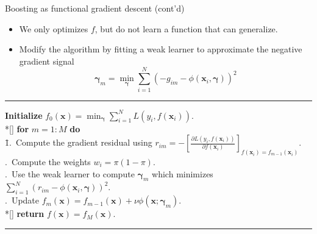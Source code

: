\documentclass[10pt,mathserif]{beamer}
\begin{document}
\begin{frame}{Boosting as functional gradient descent (cont'd)}
\begin{itemize}
    \item We only optimizes $f$, but do not learn a function that can generalize.
    \item Modify the algorithm by fitting a weak learner to approximate the negative gradient signal
    \begin{equation*}
        \bm{\gamma}_m = \min_{\bm{\gamma}} \sum_{i=1}^N (-g_{im} - \phi(\bm{x}_i,\bm{\gamma}))^2
    \end{equation*}
\end{itemize}

\noindent\rule[-5pt]{\textwidth}{0.4pt}
{\footnotesize
\begin{tabbing}
    {\bf Initialize} $f_0(\bm{x} ) = \min_{\bm{\gamma}} \sum_{i=1}^N L(y_i, f(\bm{x}_i))$. \\*[\smallskipamount]
    {\bf for} $m=1:M$ {\bf do}\\
    \qquad \= 1.\ Compute the gradient residual using $r_{im}  = - [\frac{\partial L(y_i, f(\bm{x}_i))}{\partial f(\bm{x}_i)}]_{f(\bm{x}_i)= f_{m-1}(\bm{x}_i)}$. \\
    .\ Compute the weights $w_i = \pi(1 - \pi)$. \\
    .\ Use the weak learner to compute $\bm{\gamma}_m$ which minimizes $\sum_{i=1}^N (r_{im} - \phi(\bm{x}_i,\bm{\gamma}))^2$. \\
    .\ Update $f_m(\bm{x}) = f_{m-1}(\bm{x})  + \nu\phi(\bm{x};\bm{\gamma}_m)$. \\*[\smallskipamount]
    {\bf return} $f(\bm{x})=f_M(\bm{x})$.
\end{tabbing}}
\noindent\rule[10pt]{\textwidth}{0.4pt}    
\end{frame}
\end{document}
